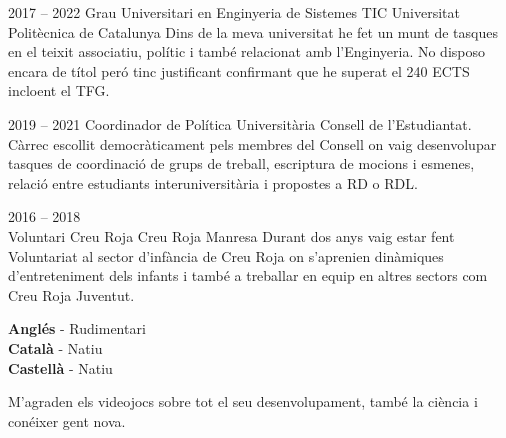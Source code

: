 \documentclass[9pt]{developercv} %
\begin{document}

\begin{entrylist}
	\entry
		{2017 -- 2022}
		{Grau Universitari en Enginyeria de Sistemes TIC}
		{Universitat Politècnica de Catalunya}
		{Dins de la meva universitat he fet un munt de tasques en el teixit associatiu, polític i també
relacionat amb l’Enginyeria. No disposo encara de títol peró tinc justificant confirmant que he superat el 240 ECTS incloent el TFG.}
\end{entrylist}


\begin{entrylist}
	\entry
	{2019 -- 2021}
	{Coordinador de Política Universitària}
	{Consell de l'Estudiantat.}
	{ Càrrec escollit democràticament pels membres del Consell on vaig desenvolupar tasques de
	coordinació de grups de treball, escriptura de mocions i esmenes, relació entre estudiants
	interuniversitària i propostes a RD o RDL.
	\\ }

	\entry
	{2016 -- 2018\\}
	{Voluntari Creu Roja}
	{Creu Roja Manresa}
	{Durant dos anys vaig estar fent Voluntariat al sector d’infància de Creu Roja on s’aprenien
	dinàmiques d’entreteniment dels infants i també a treballar en equip en altres sectors com Creu
	Roja Juventut. \\ }
\end{entrylist}

\begin{minipage}[t]{0.3\textwidth}
	\vspace{-\baselineskip} %

	
	\textbf{Anglés} - Rudimentari\\
	\textbf{Català} - Natiu\\
	\textbf{Castellà} - Natiu
\end{minipage}
\hfill
\begin{minipage}[t]{0.3\textwidth}
	\vspace{-\baselineskip} %
	
	
   M'agraden els videojocs sobre tot el seu desenvolupament, també la ciència i conéixer gent nova.
	
\end{minipage}
\hfill

\end{document}
